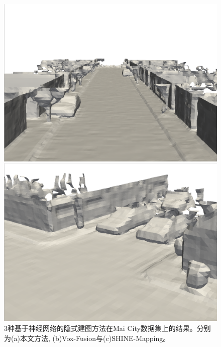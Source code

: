 \begin{figure}[htbp]
\begin{minipage}{0.322\linewidth}
    \includegraphics[width=1\linewidth]{figures/mai_1_shine.png}
    \end{minipage}\hfill
    \begin{minipage}{0.322\linewidth}
    \centering
    \includegraphics[width=1\linewidth]{figures/mai_2_shine.png}
    \end{minipage}
\caption{3种基于神经网络的隐式建图方法在Mai City数据集上的结果。分别为(a)本文方法, (b)Vox-Fusion与(c)SHINE-Mapping。}\label{mairesult}
\end{figure}

